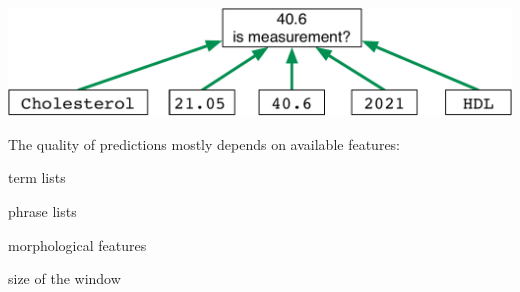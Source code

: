 \documentclass[landscape,footrule]{foils}
\begin{document}
\centerline{\includegraphics[scale=1.0, trim= 0cm 0.0cm -3cm 0cm, clip]{prediction-window}}

The quality of predictions mostly depends on available features:
\begin{triangles}
\item term lists
\item phrase lists
\item morphological features
\item size of the window
\end{triangles}  

\enlargethispage{3cm}
\end{document}
